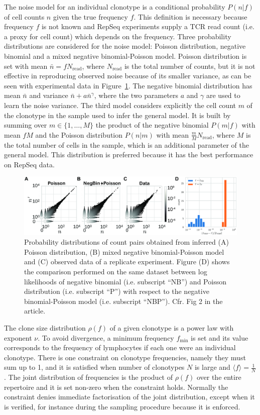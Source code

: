 \documentclass[a4paper,twocolumn]{article}
\begin{document}
The noise model for an individual clonotype is a conditional probability $P(n|f)$ of cell counts $n$ given the true frequency $f$. This definition is necessary because frequency $f$ is not known and RepSeq experiments supply a TCR read count (i.e. a proxy for cell count) which depends on the frequency.
Three probability distributions are considered for the noise model: Poisson distribution, negative binomial and a mixed negative binomial-Poisson model. Poisson distribution is set with mean $\bar{n} = f N_\mathrm{read}$, where $N_\mathrm{read}$ is the total number of counts, but it is not effective in reproducing observed noise because of its smaller variance, as can be seen with experimental data in Figure~\ref{fig:noise}. The negative binomial distribution has mean $\bar{n}$ and variance $\bar{n} + a \bar{n}^\gamma$, where the two parameters $a$ and $\gamma$ are used to learn the noise variance. The third model considers explicitly the cell count $m$ of the clonotype in the sample used to infer the general model. It is built by summing over $m \in \{1, \dots, M\}$ the product of the negative binomial $P(m|f)$ with mean $f M$ and the Poisson distribution $P(n|m)$ with mean $\frac{m}{M} N_\mathrm{read}$, where $M$ is the total number of cells in the sample, which is an additional parameter of the general model. This distribution is preferred because it has the best performance on RepSeq data.
\begin{figure}[ht]
  \centering
  \includegraphics*[keepaspectratio=true,width=\textwidth]{./report/pcbi.1007873.g002}
  \caption{Probability distributions of count pairs obtained from inferred (A) Poisson distribution, (B) mixed negative binomial-Poisson model and (C) observed data of a replicate experiment. Figure (D) shows the comparison performed on the same dataset between log likelihoods of negative binomial (i.e. subscript ``NB'') and Poisson distribution (i.e. subscript ``P'') with respect to the negative binomial-Poisson model (i.e. subscript ``NBP''). Cfr. Fig 2 in the article.}
  \label{fig:noise}
\end{figure}

The clone size distribution $\rho(f)$ of a given clonotype is a power law with exponent $\nu$. To avoid divergence, a minimum frequency $f_\mathrm{min}$ is set and its value corresponds to the frequency of lymphocytes if each one were an individual clonotype. There is one constraint on clonotype frequencies, namely they must sum up to 1, and it is satisfied when number of clonotypes $N$ is large and $\langle f \rangle = \frac{1}{N}$.
The joint distribution of frequencies is the product of $\rho(f)$ over the entire repertoire and it is set non-zero when the constraint holds. Normally the constraint denies immediate factorisation of the joint distribution, except when it is verified, for instance during the sampling procedure because it is enforced.
\end{document}
